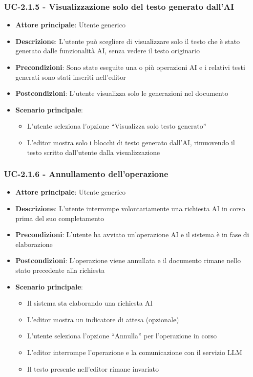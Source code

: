 \documentclass[11pt,a4paper]{article}
\begin{document}
\subsubsection{UC-2.1.5 - Visualizzazione solo del testo generato dall’AI}
\begin{itemize}
    \item \textbf{Attore principale}: Utente generico
    \item \textbf{Descrizione}: L’utente può scegliere di visualizzare solo il testo che è stato generato dalle funzionalità AI, senza vedere il testo originario
    \item \textbf{Precondizioni}: Sono state eseguite una o più operazioni AI e i relativi testi generati sono stati inseriti nell’editor
    \item \textbf{Postcondizioni}: L’utente visualizza solo le generazioni nel documento
    \item \textbf{Scenario principale}:
    \begin{itemize}
        \item L’utente seleziona l’opzione “Visualizza solo testo generato”
        \item L’editor mostra solo i blocchi di testo generato dall’AI, rimuovendo il testo scritto dall’utente dalla visualizzazione
    \end{itemize}
\end{itemize}

\subsubsection{UC-2.1.6 - Annullamento dell’operazione}
\begin{itemize}
    \item \textbf{Attore principale}: Utente generico
    \item \textbf{Descrizione}: L’utente interrompe volontariamente una richiesta AI in corso prima del suo completamento
    \item \textbf{Precondizioni}: L'utente ha avviato un'operazione AI e il sistema è in fase di elaborazione
    \item \textbf{Postcondizioni}: L’operazione viene annullata e il documento rimane nello stato precedente alla richiesta
    \item \textbf{Scenario principale}:
    \begin{itemize}
        \item Il sistema sta elaborando una richiesta AI
        \item L’editor mostra un indicatore di attesa (opzionale)
        \item L’utente seleziona l’opzione “Annulla” per l’operazione in corso
        \item L’editor interrompe l’operazione e la comunicazione con il servizio LLM
        \item Il testo presente nell’editor rimane invariato
    \end{itemize}
\end{itemize}
\end{document}
